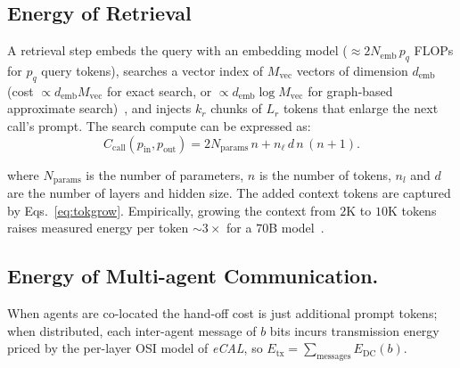 \documentclass[journal]{IEEEtran}
\newcommand{\ecal}{\textit{eCAL}}
\begin{document}
\subsection{Energy of Retrieval} 
A retrieval step embeds the query with an embedding model
($\approx 2N_{\mathrm{emb}}\,p_q$ FLOPs for $p_q$ query tokens), searches a vector index of
$M_{\mathrm{vec}}$ vectors of dimension $d_{\mathrm{emb}}$ (cost $\propto d_{\mathrm{emb}}M_{\mathrm{vec}}$
for exact search, or $\propto d_{\mathrm{emb}}\log M_{\mathrm{vec}}$ for graph-based approximate
search)~\cite{HNSW_Malkov2020}, and injects $k_r$ chunks of $L_r$ tokens that enlarge the next
call's prompt. The search compute can be expressed as: 
\begin{equation}
C_{\mathrm{call}}(p_{\mathrm{in}},p_{\mathrm{out}}) = 2N_{\mathrm{params}}\,n + n_\ell\, d\, n\,(n+1).
\label{eq:ccall}
\end{equation}

\noindent where $N_{\mathrm{params}}$ is the number of parameters, $n$ is the number of tokens, $n_l$ and $d$ are the number of layers and hidden size. The added context tokens are
captured by
Eqs.~\eqref{eq:tokgrow}. Empirically, growing the context from $2$K to $10$K tokens raises measured energy per token
$\sim\!3\times$ for a $70$B model~\cite{tokenpowerbench2026,sweetspot2026}. 

\subsection{Energy of Multi-agent Communication.}\label{sec:comm}
When agents are co-located the hand-off cost is just additional
prompt tokens; when distributed, each inter-agent message of $b$ bits incurs transmission energy
priced by the per-layer OSI model of \ecal{}, so $E_{\mathrm{tx}}=\sum_{\text{messages}}E_{\mathrm{DC}}(b)$.
\end{document}
